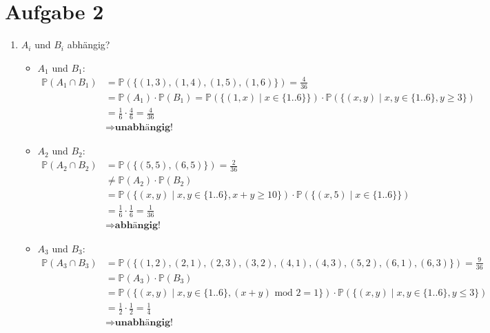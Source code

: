 \documentclass[10pt,a4paper,parskip=half]{scrartcl}
\newcommand{\PP}{\mathbb{P}}
\begin{document}
\section*{Aufgabe 2}
\begin{enumerate}
	\item $A_i$ und $B_i$ abhängig?
		\begin{itemize}
			\item $A_1$ und $B_1$: \\
				\begin{align*}
					\PP(A_1 \cap B_1) &= \PP(\{(1,3),(1,4),(1,5),(1,6)\})  = \frac{4}{36} \\
					&= \PP(A_1) \cdot \PP(B_1) =  \PP(\{(1,x) \mid x \in \{1..6\}\}) \cdot \PP(\{(x,y) \mid x,y \in \{1..6\}, y \ge 3\}) \\
					&= \frac{1}{6} \cdot \frac{4}{6} = \frac{4}{36} \\
					&\Rightarrow \textbf{unabhängig!}
				\end{align*}
			\item $A_2$ und $B_2$: \\
				\begin{align*}
					\PP(A_2 \cap B_2) &= \PP(\{(5,5),(6,5)\})  = \frac{2}{36} \\
					&\neq \PP(A_2) \cdot \PP(B_2) \\
					&= \PP(\{(x,y) \mid x,y \in \{1..6\}, x+y \ge 10\}) \cdot \PP(\{(x,5) \mid x \in \{1..6\}\}) \\
					&= \frac{1}{6} \cdot \frac{1}{6} = \frac{1}{36} \\
					&\Rightarrow \textbf{abhängig!}
				\end{align*}
			\item $A_3$ und $B_3$: \\
				\begin{align*}
					\PP(A_3 \cap B_3) &= \PP(\{(1, 2), (2, 1), (2, 3), (3, 2), (4, 1), (4, 3), (5, 2),(6, 1),(6, 3)\})  = \frac{9}{36} \\
					&= \PP(A_3) \cdot \PP(B_3) \\
					& = \PP(\{(x,y) \mid x,y \in \{1..6\}, (x + y) \text{ mod } 2 = 1\}) \cdot \PP(\{ (x,y) \mid x,y \in \{1..6\}, y \le 3\}) \\
					&= \frac{1}{2} \cdot \frac{1}{2} = \frac{1}{4} \\
					&\Rightarrow \textbf{unabhängig!}
				\end{align*}
		\end{itemize}
\end{enumerate}
\end{document}
